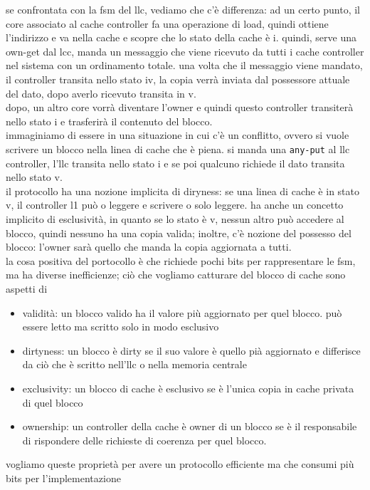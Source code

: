 \documentclass[12pt, oneside]{extbook} %
\begin{document}
se confrontata con la fsm del llc, vediamo che c'è differenza: ad un certo punto, il core associato al cache controller fa una operazione di load, quindi ottiene l'indirizzo e va nella cache e scopre che lo stato della cache è i. quindi, serve una own-get dal lcc, manda un messaggio che viene ricevuto da tutti i cache controller nel sistema con un ordinamento totale. una volta che il messaggio viene mandato, il controller transita nello stato iv, la copia verrà inviata dal possessore attuale del dato, dopo averlo ricevuto transita in v. \\ dopo, un altro core vorrà diventare l'owner e quindi questo controller transiterà nello stato i e trasferirà il contenuto del blocco.\\ immaginiamo di essere in una situazione in cui c'è un conflitto, ovvero si vuole scrivere un blocco nella linea di cache che è piena. si manda una \texttt{any-put} al llc controller, l'llc transita nello stato i e se poi qualcuno richiede il dato transita nello stato v.\\ il protocollo ha una nozione implicita di diryness: se una linea di cache è in stato v, il controller l1 può o leggere e scrivere o solo leggere. ha anche un concetto implicito di esclusività, in quanto se lo stato è v, nessun altro può accedere al blocco, quindi nessuno ha una copia valida; inoltre, c'è nozione del possesso del blocco: l'owner sarà quello che manda la copia aggiornata a tutti.\\ la cosa positiva del portocollo è che richiede pochi bits per rappresentare le fsm, ma ha diverse inefficienze; ciò che vogliamo catturare del blocco di cache sono aspetti di
\begin{itemize}
\item validità: un blocco valido ha il valore più aggiornato per quel blocco. può essere letto ma scritto solo in modo esclusivo
\item dirtyness: un blocco è dirty se il suo valore è quello pià aggiornato e differisce da ciò che è scritto nell'llc o nella memoria centrale
\item exclusivity: un blocco di cache è esclusivo se è l'unica copia in cache privata di quel blocco
\item ownership: un controller della cache è owner di un blocco se è il responsabile di rispondere delle richieste di coerenza per quel blocco.
\end{itemize}
vogliamo queste proprietà per avere un protocollo efficiente ma che consumi più bits per l'implementazione
\end{document}
